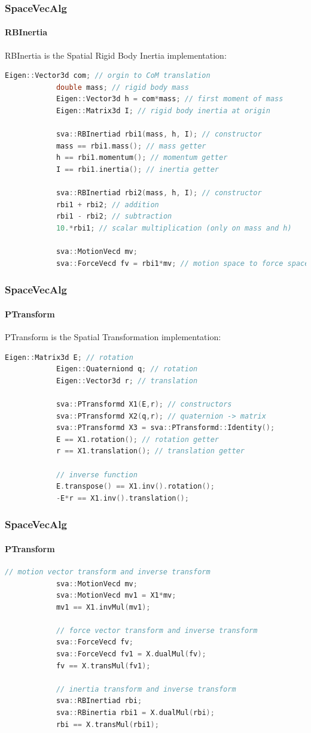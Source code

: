 \documentclass{beamer}
\begin{document}
  	\begin{frame}[fragile]
		\frametitle{SpaceVecAlg}
		\framesubtitle{RBInertia}
		RBInertia is the Spatial Rigid Body Inertia implementation:
		\begin{lstlisting}[language=C++]
			Eigen::Vector3d com; // orgin to CoM translation
			double mass; // rigid body mass
			Eigen::Vector3d h = com*mass; // first moment of mass
			Eigen::Matrix3d I; // rigid body inertia at origin

			sva::RBInertiad rbi1(mass, h, I); // constructor
			mass == rbi1.mass(); // mass getter
			h == rbi1.momentum(); // momentum getter
			I == rbi1.inertia(); // inertia getter

			sva::RBInertiad rbi2(mass, h, I); // constructor
			rbi1 + rbi2; // addition
			rbi1 - rbi2; // subtraction
			10.*rbi1; // scalar multiplication (only on mass and h)

			sva::MotionVecd mv;
			sva::ForceVecd fv = rbi1*mv; // motion space to force space
		\end{lstlisting}
	\end{frame}


  	\begin{frame}[fragile]
		\frametitle{SpaceVecAlg}
		\framesubtitle{PTransform}
		PTransform is the Spatial Transformation implementation:
		\begin{lstlisting}[language=C++]
			Eigen::Matrix3d E; // rotation
			Eigen::Quaterniond q; // rotation
			Eigen::Vector3d r; // translation

			sva::PTransformd X1(E,r); // constructors
			sva::PTransformd X2(q,r); // quaternion -> matrix
			sva::PTransformd X3 = sva::PTransformd::Identity();
			E == X1.rotation(); // rotation getter
			r == X1.translation(); // translation getter

			// inverse function
			E.transpose() == X1.inv().rotation();
			-E*r == X1.inv().translation();
		\end{lstlisting}
	\end{frame}
  	\begin{frame}[fragile]
		\frametitle{SpaceVecAlg}
		\framesubtitle{PTransform}
		\begin{lstlisting}[language=C++]
			// motion vector transform and inverse transform
			sva::MotionVecd mv;
			sva::MotionVecd mv1 = X1*mv;
			mv1 == X1.invMul(mv1);

			// force vector transform and inverse transform
			sva::ForceVecd fv;
			sva::ForceVecd fv1 = X.dualMul(fv);
			fv == X.transMul(fv1);

			// inertia transform and inverse transform
			sva::RBInertiad rbi;
			sva::RBinertia rbi1 = X.dualMul(rbi);
			rbi == X.transMul(rbi1);
		\end{lstlisting}
	\end{frame}
\end{document}

